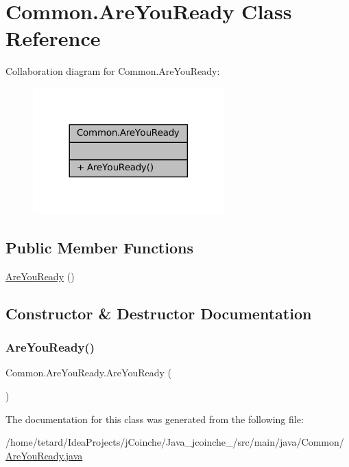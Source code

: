 \hypertarget{classCommon_1_1AreYouReady}{}\section{Common.\+Are\+You\+Ready Class Reference}
\label{classCommon_1_1AreYouReady}


Collaboration diagram for Common.\+Are\+You\+Ready\+:
\nopagebreak
\begin{figure}[H]
\begin{center}
\leavevmode
\includegraphics[width=209pt]{classCommon_1_1AreYouReady__coll__graph}
\end{center}
\end{figure}
\subsection*{Public Member Functions}
\begin{DoxyCompactItemize}
\item 
\mbox{\hyperlink{classCommon_1_1AreYouReady_a7c96896f70b28c0f70cec4f96fcaf64a}{Are\+You\+Ready}} ()
\end{DoxyCompactItemize}


\subsection{Constructor \& Destructor Documentation}
\mbox{\label{classCommon_1_1AreYouReady_a7c96896f70b28c0f70cec4f96fcaf64a}} 
\subsubsection{\texorpdfstring{Are\+You\+Ready()}{AreYouReady()}}
{\footnotesize\ttfamily Common.\+Are\+You\+Ready.\+Are\+You\+Ready (\begin{DoxyParamCaption}{ }\end{DoxyParamCaption})\hspace{0.3cm}{\ttfamily [inline]}}



The documentation for this class was generated from the following file\+:\begin{DoxyCompactItemize}
\item 
/home/tetard/\+Idea\+Projects/j\+Coinche/\+Java\+\_\+jcoinche\+\_/src/main/java/\+Common/\mbox{\hyperlink{AreYouReady_8java}{Are\+You\+Ready.\+java}}\end{DoxyCompactItemize}
